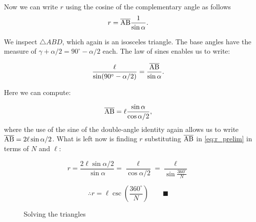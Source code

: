 \documentclass{article}
\begin{document}
Now we can write $r$ using the cosine of the complementary angle as follows
\begin{equation}
\label{eq:r_prelim}
r = \overline{\rm AB} \frac{1}{\sin \alpha}. \\ 
\end{equation}

We inspect $\triangle ABD$, which again is an isosceles triangle.  The base angles have the measure of $\gamma + \alpha / 2 = 90^\circ - \alpha / 2$ each.  The law of sines enables us to write:

\begin{equation}
    \frac{\ell}{\sin(90^\circ - \alpha / 2)}  = \frac{\overline{\rm AB}}{\sin \alpha}.
\end{equation}

Here we can compute:

\begin{equation}
    \overline{\rm AB} =  \ell \frac{\sin \alpha}{\cos \alpha/2},
\end{equation}
where the use of the sine of the double-angle identity again allows us to write $\overline{\rm AB} = 2\ell \sin \alpha/2$.  What is left now is finding $r$ substituting $\overline{\rm AB}$ in \eqref{eq:r_prelim} in terms of $N$ and $\ell$:

\begin{equation}
r = \frac{2 \ell \sin \alpha / 2}{\sin \alpha} = \frac{\ell}{\cos \alpha / 2}  = \frac{\ell}{\sin \frac{360^\circ}{N}}
\end{equation}

\begin{equation}
\therefore r  = \ell \csc \left ( \frac{360^\circ}{N} \right ) \qquad \blacksquare
\end{equation}

\begin{figure}[!t]
\centering

\caption{Solving the triangles}\label{fig:star}
\end{figure}
\end{document}

